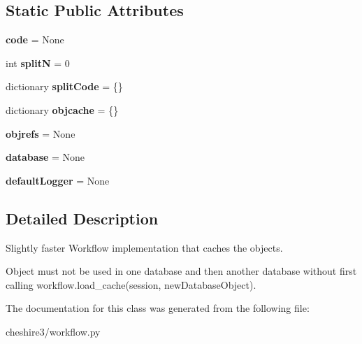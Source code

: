 \subsection*{Static Public Attributes}
\begin{DoxyCompactItemize}
\item 
\hypertarget{classcheshire3_1_1workflow_1_1_caching_workflow_a7c29ffe2cfb6aa217f7e2749688b1f53}{{\bfseries code} = None}\label{classcheshire3_1_1workflow_1_1_caching_workflow_a7c29ffe2cfb6aa217f7e2749688b1f53}

\item 
\hypertarget{classcheshire3_1_1workflow_1_1_caching_workflow_a89568dbbedbce7e338c9ab8a7c3606c2}{int {\bfseries split\-N} = 0}\label{classcheshire3_1_1workflow_1_1_caching_workflow_a89568dbbedbce7e338c9ab8a7c3606c2}

\item 
\hypertarget{classcheshire3_1_1workflow_1_1_caching_workflow_aac35550173275a15d1e7f21acc29db44}{dictionary {\bfseries split\-Code} = \{\}}\label{classcheshire3_1_1workflow_1_1_caching_workflow_aac35550173275a15d1e7f21acc29db44}

\item 
\hypertarget{classcheshire3_1_1workflow_1_1_caching_workflow_a25875243a089007a54db673a84a9defd}{dictionary {\bfseries objcache} = \{\}}\label{classcheshire3_1_1workflow_1_1_caching_workflow_a25875243a089007a54db673a84a9defd}

\item 
\hypertarget{classcheshire3_1_1workflow_1_1_caching_workflow_a02654457fba3d1656852e7efb80a80c2}{{\bfseries objrefs} = None}\label{classcheshire3_1_1workflow_1_1_caching_workflow_a02654457fba3d1656852e7efb80a80c2}

\item 
\hypertarget{classcheshire3_1_1workflow_1_1_caching_workflow_a482292b27c48b3d40e25120ad6dd49b3}{{\bfseries database} = None}\label{classcheshire3_1_1workflow_1_1_caching_workflow_a482292b27c48b3d40e25120ad6dd49b3}

\item 
\hypertarget{classcheshire3_1_1workflow_1_1_caching_workflow_a24c17292953a42edc4c9f580666e6eae}{{\bfseries default\-Logger} = None}\label{classcheshire3_1_1workflow_1_1_caching_workflow_a24c17292953a42edc4c9f580666e6eae}

\end{DoxyCompactItemize}


\subsection{Detailed Description}
\begin{DoxyVerb}Slightly faster Workflow implementation that caches the objects.

Object must not be used in one database and then another database without
first calling workflow.load_cache(session, newDatabaseObject).
\end{DoxyVerb}
 

The documentation for this class was generated from the following file\-:\begin{DoxyCompactItemize}
\item 
cheshire3/workflow.\-py\end{DoxyCompactItemize}
